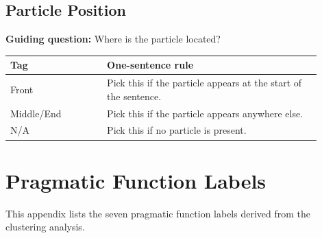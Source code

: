 \documentclass[11pt]{article}
\begin{document}
\begin{samepage}
\subsection{Particle Position}

\noindent\textbf{Guiding question:} Where is the particle located?

\vspace{0.25em}
\noindent\begin{minipage}{\linewidth}
\centering
\small
\begin{tabular}{p{0.28\linewidth}p{0.62\linewidth}}
\toprule
\textbf{Tag} & \textbf{One-sentence rule} \\
\midrule
Front & Pick this if the particle appears at the start of the sentence. \\
Middle/End & Pick this if the particle appears anywhere else. \\
N/A & Pick this if no particle is present. \\
\bottomrule
\end{tabular}
\end{minipage}
\end{samepage}

\section{Pragmatic Function Labels}
\label{app:particle-functions}

This appendix lists the seven pragmatic function labels derived from the clustering analysis.
\end{document}
